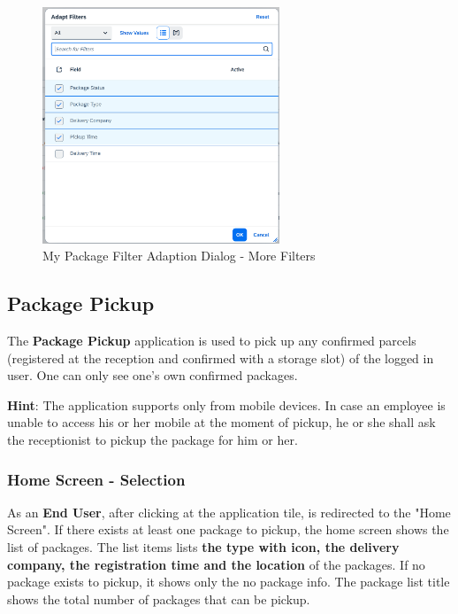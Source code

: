 \begin{figure}[H]
	\centering
	\includegraphics[height=200pt]{images/user_doc/myPack/MoreFIlterOption.png}
	\caption{My Package Filter Adaption Dialog - More Filters}
	\label{fig:mpMOreFilterAdaption}
\end{figure}
% 

\subsection{Package Pickup}
The \textbf{Package Pickup} application is used to pick up any confirmed parcels (registered at the reception and confirmed with a storage slot) of the logged in user. One can only see one's own confirmed packages. 

\textbf{Hint}: The application supports only from mobile devices. In case an employee is unable to access his or her mobile at the moment of pickup, he or she shall ask the receptionist to pickup the package for him or her.

\bigskip

\subsubsection{Home Screen - Selection}
As an \textbf{End User}, after clicking at the application tile, is redirected to the "Home Screen". If there exists at least one package to pickup, the home screen shows the list of packages. The list items lists \textbf{the type with icon, the delivery company, the registration time and the location} of the packages. If no package exists to pickup, it shows only the no package info. The package list title shows the total number of packages that can be pickup.

